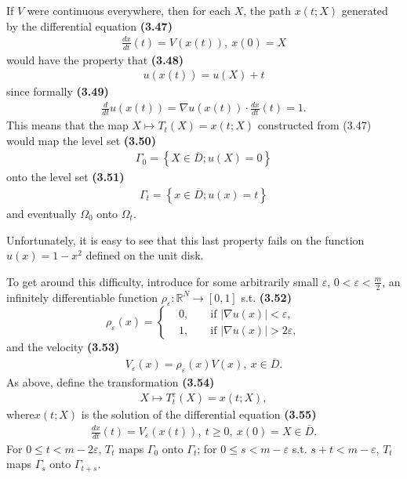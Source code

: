 \documentclass{book}
\numberwithin{equation}{section}
\begin{document}
\begin{enumerate}
\begin{enumerate}
        If $V$ were continuous everywhere, then for each $X$, the path $x(t;X)$ generated by the differential equation \textbf{(3.47)}
        \begin{align*}
            \frac{dx}{dt}(t) = V(x(t)),\ x(0) = X
        \end{align*}
        would have the property that \textbf{(3.48)}
        \begin{align*}
            u(x(t)) = u(X) + t
        \end{align*}
        since formally \textbf{(3.49)}
        \begin{align*}
            \frac{d}{dt}u(x(t)) = \nabla u(x(t))\cdot\frac{dx}{dt}(t) = 1. 
        \end{align*}
        This means that the map $X\mapsto T_t(X) = x(t;X)$ constructed from (3.47) would map the level set \textbf{(3.50)}
        \begin{align*}
            \Gamma_0 = \left\{X\in\overline{D};u(X) = 0\right\}
        \end{align*}
        onto the level set \textbf{(3.51)}
        \begin{align*}
            \Gamma_t = \left\{x\in\overline{D};u(x) = t\right\}
        \end{align*}
        and eventually $\Omega_0$ onto $\Omega_t$.
        
        Unfortunately, it is easy to see that this last property fails on the function $u(x) = 1 - x^2$ defined on the unit disk.
        
        To get around this difficulty, introduce for some arbitrarily small $\varepsilon$, $0 < \varepsilon < \frac{m}{2}$, an infinitely differentiable function $\rho_\varepsilon:\mathbb{R}^N\to[0,1]$ s.t. \textbf{(3.52)}
        \begin{equation*}
            \rho_\varepsilon(x) = \left\{\begin{split}
                &0, &&\mbox{ if } \left|\nabla u(x)\right| < \varepsilon,\\
                &1, &&\mbox{ if } \left|\nabla u(x)\right| > 2\varepsilon,
            \end{split}\right.
        \end{equation*}
        and the velocity \textbf{(3.53)}
        \begin{align*}
            V_\varepsilon(x) = \rho_\varepsilon(x)V(x),\ x\in\overline{D}.
        \end{align*}
        As above, define the transformation \textbf{(3.54)}
        \begin{align*}
            X\mapsto T_t^\varepsilon(X) = x(t;X),
        \end{align*}
        where$x(t;X)$ is the solution of the differential equation \textbf{(3.55)}
        \begin{align*}
            \frac{dx}{dt}(t) = V_\varepsilon(x(t)),\ t\ge 0,\ x(0) = X\in\overline{D}.
        \end{align*}
        For $0\le t < m - 2\varepsilon$, $T_t$ maps $\Gamma_0$ onto $\Gamma_t$; for $0\le s < m - \varepsilon$ s.t. $s + t < m - \varepsilon$, $T_t$ maps $\Gamma_s$ onto $\Gamma_{t+s}$.
        

\end{enumerate}
\end{enumerate}
\end{document}
